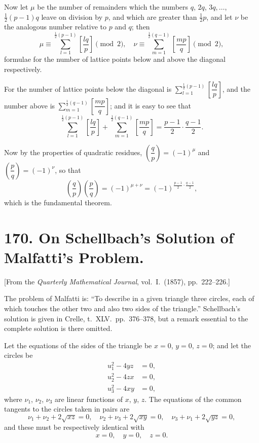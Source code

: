 \documentclass[11pt,a4paper]{book}
\begin{document}
Now let $\mu$ be the number of remainders which the numbers $q$, $2q$, $3q,\ldots$, $\frac{1}{2}(p-1)q$ leave on division by $p$, and which are greater than $\frac{1}{2}p$, and let $\nu$ be the analogous number relative to $p$ and $q$; then
\[
\mu \equiv \sum_{l=1}^{\frac{1}{2}(p-1)} \left[\frac{lq}{p}\right] \pmod{2},\quad
\nu \equiv \sum_{m=1}^{\frac{1}{2}(q-1)} \left[\frac{mp}{q}\right] \pmod{2},
\]
formulae for the number of lattice points below and above the diagonal respectively.

For the number of lattice points below the diagonal is $\sum\limits_{l=1}^{\frac{1}{2}(p-1)} \left[\dfrac{lq}{p}\right]$, and the number above is $\sum\limits_{m=1}^{\frac{1}{2}(q-1)} \left[\dfrac{mp}{q}\right]$; and it is easy to see that
\[
\sum_{l=1}^{\frac{1}{2}(p-1)} \left[\frac{lq}{p}\right]
+ \sum_{m=1}^{\frac{1}{2}(q-1)} \left[\frac{mp}{q}\right]
= \frac{p-1}{2} \cdot \frac{q-1}{2}.
\]

Now by the properties of quadratic residues, $\left(\dfrac{q}{p}\right) = (-1)^{\mu}$ and $\left(\dfrac{p}{q}\right) = (-1)^{\nu}$, so that
\[
\left(\frac{q}{p}\right)\left(\frac{p}{q}\right) = (-1)^{\mu+\nu}
= (-1)^{\frac{p-1}{2}\cdot\frac{q-1}{2}},
\]
which is the fundamental theorem.


\newpage
\section*{170. On Schellbach's Solution of Malfatti's Problem.}

[From the \textit{Quarterly Mathematical Journal}, vol.~I.~(1857), pp.~222--226.]

The problem of Malfatti is: ``To describe in a given triangle three circles, each of which touches the other two and also two sides of the triangle.'' Schellbach's solution is given in Crelle, t.~XLV.~pp.~376--378, but a remark essential to the complete solution is there omitted.

Let the equations of the sides of the triangle be $x=0$, $y=0$, $z=0$; and let the circles be
\[
\begin{aligned}
u_1^2 - 4yz &= 0, \\
u_2^2 - 4zx &= 0, \\
u_3^2 - 4xy &= 0,
\end{aligned}
\]
where $\nu_1$, $\nu_2$, $\nu_3$ are linear functions of $x$, $y$, $z$. The equations of the common tangents to the circles taken in pairs are
\[
\nu_1 + \nu_2 + 2\sqrt{xz} = 0,\quad
\nu_2 + \nu_3 + 2\sqrt{xy} = 0,\quad
\nu_3 + \nu_1 + 2\sqrt{yz} = 0,
\]
and these must be respectively identical with
\[
x=0,\quad y=0,\quad z=0.
\]
\end{document}
